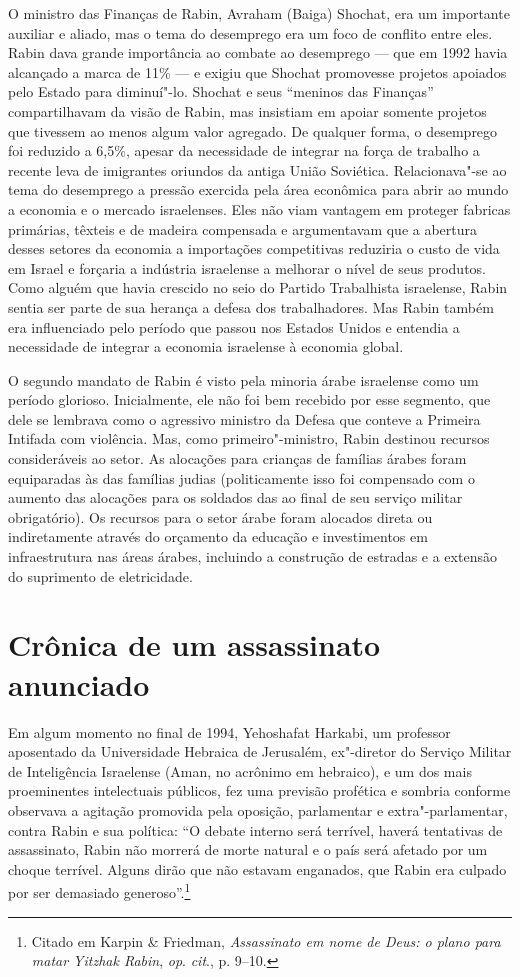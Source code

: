 O ministro das Finanças de Rabin, Avraham (Baiga) Shochat, era um
importante auxiliar e aliado, mas o tema do desemprego era um foco de
conflito entre eles. Rabin dava grande importância ao combate ao
desemprego --- que em 1992 havia alcançado a marca de 11\% --- e exigiu que
Shochat promovesse projetos apoiados pelo Estado para diminuí"-lo.
Shochat e seus ``meninos das Finanças'' compartilhavam da visão de Rabin,
mas insistiam em apoiar somente projetos que tivessem ao menos algum
valor agregado. De qualquer forma, o desemprego foi reduzido a 6,5\%,
apesar da necessidade de integrar na força de trabalho a recente leva de
imigrantes oriundos da antiga União Soviética. Relacionava"-se ao tema do
desemprego a pressão exercida pela área econômica para abrir ao mundo a
economia e o mercado israelenses. Eles não viam vantagem em proteger
fabricas primárias, têxteis e de madeira compensada e argumentavam que a
abertura desses setores da economia a importações competitivas reduziria
o custo de vida em Israel e forçaria a indústria israelense a melhorar o
nível de seus produtos. Como alguém que havia crescido no seio do
Partido Trabalhista israelense, Rabin sentia ser parte de sua herança a
defesa dos trabalhadores. Mas Rabin também era influenciado pelo período
que passou nos Estados Unidos e entendia a necessidade de integrar a
economia israelense à economia global.

O segundo mandato de Rabin é visto pela minoria árabe israelense como um
período glorioso. Inicialmente, ele não foi bem recebido por esse
segmento, que dele se lembrava como o agressivo ministro da Defesa que
conteve a Primeira Intifada com violência. Mas, como primeiro"-ministro,
Rabin destinou recursos consideráveis ao setor. As alocações para
crianças de famílias árabes foram equiparadas às das famílias judias
(politicamente isso foi compensado com o aumento das alocações para os
soldados das  ao final de seu serviço militar obrigatório). Os
recursos para o setor árabe foram alocados direta ou indiretamente
através do orçamento da educação e investimentos em infraestrutura nas
áreas árabes, incluindo a construção de estradas e a extensão do
suprimento de eletricidade.

\section{Crônica de um assassinato anunciado}

Em algum momento no final de 1994, Yehoshafat Harkabi, um professor
aposentado da Universidade Hebraica de Jerusalém, ex"-diretor do Serviço
Militar de Inteligência Israelense (Aman, no acrônimo em hebraico), e um dos mais proeminentes intelectuais
públicos, fez uma previsão profética e sombria conforme observava a
agitação promovida pela oposição, parlamentar e extra"-parlamentar,
contra Rabin e sua política: ``O debate interno será terrível, haverá
tentativas de assassinato, Rabin não morrerá de morte natural e o país
será afetado por um choque terrível. Alguns dirão que não estavam
enganados, que Rabin era culpado por ser demasiado generoso''.\footnote{Citado em Karpin
\& Friedman, \emph{Assassinato em nome de Deus: o plano para matar Yitzhak
Rabin}, \emph{op}. \emph{cit}., p. 9--10.}


